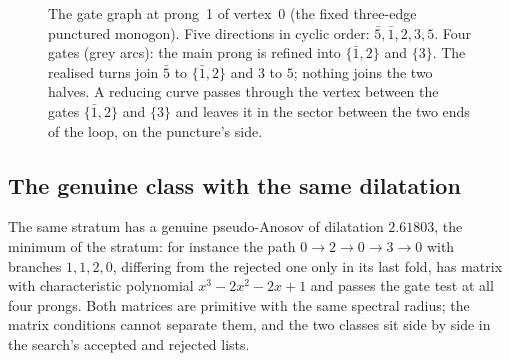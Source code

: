 \documentclass[12pt]{amsart}
\newcommand{\anti}[1]{\bar{#1}}          %
\newcommand{\set}[1]{\{#1\}}
\theoremstyle{plain}
\theoremstyle{definition}
\begin{document}
\begin{figure}[t]
  \centering
  \caption{The gate graph at prong~1 of vertex~0 (the fixed three-edge
    punctured monogon).  Five directions in cyclic order:
    $\anti5,\anti1,2,3,5$.  Four gates (grey arcs): the main prong is
    refined into $\set{\anti1,2}$ and $\set{3}$.  The realised turns join
    $\anti5$ to $\set{\anti1,2}$ and $3$ to $5$; nothing joins the two
    halves.  A reducing curve passes through the vertex between the gates
    $\set{\anti1,2}$ and $\set{3}$ and leaves it in the sector between the
    two ends of the loop, on the puncture's side.}
  \label{fig:badvertex}
\end{figure}

\subsection{The genuine class with the same dilatation}
The same stratum has a genuine pseudo-Anosov of dilatation $2.61803$,
the minimum of the stratum: for instance the path $0\to2\to0\to3\to0$
with branches $1,1,2,0$, differing from the rejected one only in its last
fold, has matrix with characteristic polynomial $x^3-2x^2-2x+1$ and
passes the gate test at all four prongs.  Both matrices are primitive
with the same spectral radius; the matrix conditions cannot separate
them, and the two classes sit side by side in the search's accepted and
rejected lists.
\end{document}

